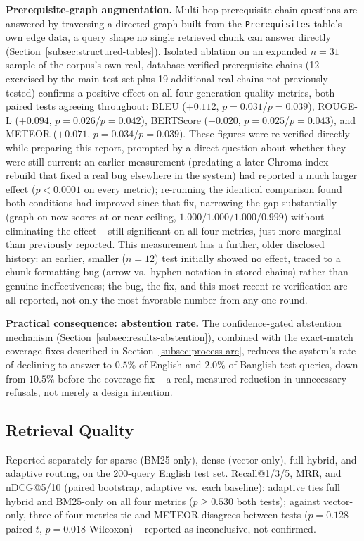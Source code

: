\documentclass[a4paper,twoside]{article}
\begin{document}
\textbf{Prerequisite-graph augmentation.} Multi-hop prerequisite-chain questions are answered by traversing a directed graph built from the \texttt{Prerequisites} table's own edge data, a query shape no single retrieved chunk can answer directly (Section~\ref{subsec:structured-tables}). Isolated ablation on an expanded $n=31$ sample of the corpus's own real, database-verified prerequisite chains (12 exercised by the main test set plus 19 additional real chains not previously tested) confirms a positive effect on all four generation-quality metrics, both paired tests agreeing throughout: BLEU ($+0.112$, $p=0.031$/$p=0.039$), ROUGE-L ($+0.094$, $p=0.026$/$p=0.042$), BERTScore ($+0.020$, $p=0.025$/$p=0.043$), and METEOR ($+0.071$, $p=0.034$/$p=0.039$). These figures were re-verified directly while preparing this report, prompted by a direct question about whether they were still current: an earlier measurement (predating a later Chroma-index rebuild that fixed a real bug elsewhere in the system) had reported a much larger effect ($p<0.0001$ on every metric); re-running the identical comparison found both conditions had improved since that fix, narrowing the gap substantially (graph-on now scores at or near ceiling, $1.000$/$1.000$/$1.000$/$0.999$) without eliminating the effect -- still significant on all four metrics, just more marginal than previously reported. This measurement has a further, older disclosed history: an earlier, smaller ($n=12$) test initially showed no effect, traced to a chunk-formatting bug (arrow vs.\ hyphen notation in stored chains) rather than genuine ineffectiveness; the bug, the fix, and this most recent re-verification are all reported, not only the most favorable number from any one round.

\textbf{Practical consequence: abstention rate.} The confidence-gated abstention mechanism (Section~\ref{subsec:results-abstention}), combined with the exact-match coverage fixes described in Section~\ref{subsec:process-arc}, reduces the system's rate of declining to answer to $0.5\%$ of English and $2.0\%$ of Banglish test queries, down from $10.5\%$ before the coverage fix -- a real, measured reduction in unnecessary refusals, not merely a design intention.

\subsection{Retrieval Quality}
\label{subsec:results-retrieval}

Reported separately for sparse (BM25-only), dense (vector-only), full hybrid, and adaptive routing, on the 200-query English test set. Recall@1/3/5, MRR, and nDCG@5/10 (paired bootstrap, adaptive vs.\ each baseline): adaptive ties full hybrid and BM25-only on all four metrics ($p\geq0.530$ both tests); against vector-only, three of four metrics tie and METEOR disagrees between tests ($p=0.128$ paired $t$, $p=0.018$ Wilcoxon) -- reported as inconclusive, not confirmed.
\end{document}
